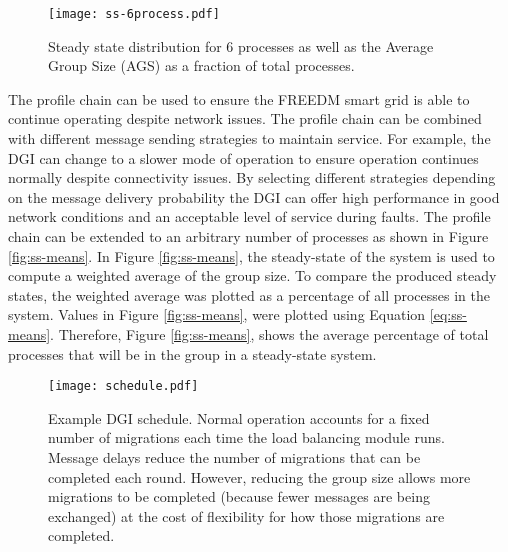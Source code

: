 \begin{figure}
    \centering
    \texttt{[image: ss-6process.pdf]}
    \caption{Steady state distribution for 6 processes as well as the Average Group Size (AGS) as a fraction of total processes.}
    \label{fig:ss-6process}
\end{figure}

The profile chain can be used to ensure the FREEDM smart grid is able to continue operating despite network issues.
The profile chain can be combined with different message sending strategies to maintain service.
For example, the DGI can change to a slower mode of operation to ensure operation continues normally despite connectivity issues.
By selecting different strategies depending on the message delivery probability the DGI can offer high performance in good network conditions and an acceptable level of service during faults.
The profile chain can be extended to an arbitrary number of processes as shown in Figure \ref{fig:ss-means}.
In Figure \ref{fig:ss-means}, the steady-state of the system is used to compute a weighted average of the group size.
To compare the produced steady states, the weighted average was plotted as a percentage of all processes in the system.
Values in Figure \ref{fig:ss-means}, were plotted using Equation \ref{eq:ss-means}.
Therefore, Figure \ref{fig:ss-means}, shows the average percentage of total processes that will be in the group in a steady-state system.

\begin{figure}
    \centering
    \texttt{[image: schedule.pdf]}
    \caption{Example DGI schedule. Normal operation accounts for a fixed number of migrations each time the load balancing module runs. Message delays reduce the number of migrations that can be completed each round. However, reducing the group size allows more migrations to be completed (because fewer messages are being exchanged) at the cost of flexibility for how those migrations are completed.}
    \label{fig:schedule}
\end{figure}

